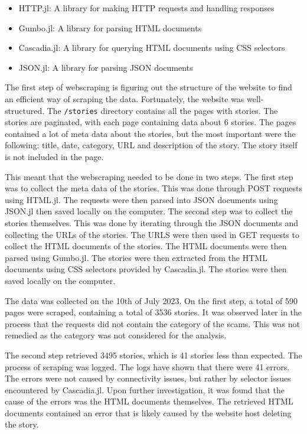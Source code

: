 \begin{itemize}
    \item HTTP.jl: A library for making HTTP requests and handling responses 
    \item Gumbo.jl: A library for parsing HTML documents
    \item Cascadia.jl: A library for querying HTML documents using CSS selectors
    \item JSON.jl: A library for parsing JSON documents
\end{itemize}

The first step of webscraping is figuring out the structure of the website to find an efficient way of scraping the data. Fortunately, the website was well-structured. The \texttt{/stories} directory contains all the pages with stories. The stories are paginated, with each page containing data about 6 stories. The pages contained a lot of meta data about the stories, but the most important were the following: title, date, category, URL and description of the story. The story itself is not included in the page. 

This meant that the webscraping needed to be done in two steps. The first step was to collect the meta data of the stories. This was done through POST requests using HTML.jl. The requests were then parsed into JSON documents using JSON.jl then saved locally on the computer. The second step was to collect the stories themselves. This was done by iterating through the JSON documents and collecting the URLs of the stories. The URLS were then used in GET requests to collect the HTML documents of the stories. The HTML documents were then parsed using Gumbo.jl. The stories were then extracted from the HTML documents using CSS selectors provided by Cascadia.jl. The stories were then saved locally on the computer.

The data was collected on the 10th of July 2023. On the first step, a total of 590 pages were scraped, containing a total of 3536 stories. It was observed later in the process that the requests did not contain the category of the scams. This was not remedied as the category was not considered for the analysis.

The second step retrieved 3495 stories, which is 41 stories less than expected. The process of scraping was logged. The logs have shown that there were 41 errors. The errors were not caused by connectivity issues, but rather by selector issues encountered by Cascadia.jl. Upon further investigation, it was found that the cause of the errors was the HTML documents themselves. The retrieved HTML documents contained an error that is likely caused by the website host deleting the story.


